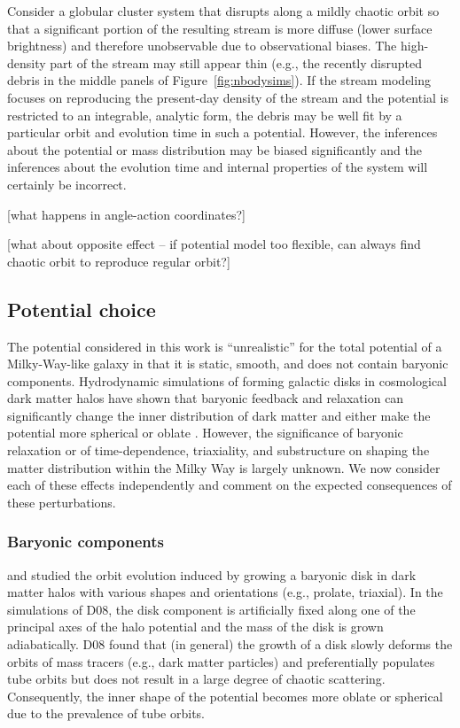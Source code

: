 \documentclass[letterpaper,12pt,preprint]{aastex}
\begin{document}
Consider a globular cluster system that disrupts along a mildly chaotic orbit so that a significant portion of the resulting stream is more diffuse (lower surface brightness) and therefore unobservable due to observational biases. The high-density part of the stream may still appear thin (e.g., the recently disrupted debris in the middle panels of Figure~\ref{fig:nbodysims}). If the stream modeling focuses on reproducing the present-day density of the stream and the potential is restricted to an integrable, analytic form, the debris may be well fit by a particular orbit and evolution time in such a potential. However, the inferences about the potential or mass distribution may be biased significantly and the inferences about the evolution time and internal properties of the system will certainly be incorrect.

[what happens in angle-action coordinates?]

[what about opposite effect -- if potential model too flexible, can always find chaotic orbit to reproduce regular orbit?]

\subsection{Potential choice}

The potential considered in this work is ``unrealistic'' for the total potential of a Milky-Way-like galaxy in that it is static, smooth, and does not contain baryonic components. Hydrodynamic simulations of forming galactic disks in cosmological dark matter halos have shown that baryonic feedback and relaxation can significantly change the inner distribution of dark matter and either make the potential more spherical or oblate \citep{many}. However, the significance of baryonic relaxation or of time-dependence, triaxiality, and substructure on shaping the matter distribution within the Milky Way is largely unknown. We now consider each of these effects independently and comment on the expected consequences of these perturbations.

\subsubsection{Baryonic components}

\cite[][D08]{debattista08} and \cite[][V10]{valluri10} studied the orbit evolution induced by growing a baryonic disk in dark matter halos with various shapes and orientations (e.g., prolate, triaxial). In the simulations of D08, the disk component is artificially fixed along one of the principal axes of the halo potential and the mass of the disk is grown adiabatically. D08 found that (in general) the growth of a disk slowly deforms the orbits of mass tracers (e.g., dark matter particles) and preferentially populates tube orbits but does not result in a large degree of chaotic scattering. Consequently, the inner shape of the potential becomes more oblate or spherical due to the prevalence of tube orbits. 
\end{document}
